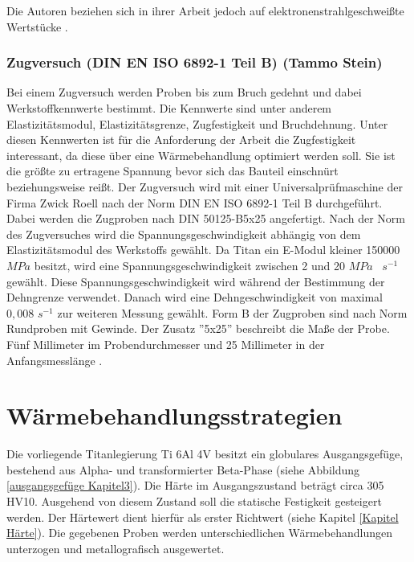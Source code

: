 \documentclass[a4paper, 11pt]{tubsreprt}
\begin{document}
Die Autoren beziehen sich in ihrer Arbeit jedoch auf elektronenstrahlgeschweißte Wertstücke \cite{Shi2013}.
\subsection{Zugversuch (DIN EN ISO 6892-1 Teil B) (Tammo Stein)}
\label{Kapitel Zugversuch}
Bei einem Zugversuch werden Proben bis zum Bruch gedehnt und dabei Werkstoffkennwerte bestimmt. Die Kennwerte sind unter anderem  Elastizitätsmodul, Elastizitätsgrenze, Zugfestigkeit und Bruchdehnung. Unter diesen Kennwerten ist für die Anforderung der Arbeit die Zugfestigkeit interessant, da diese über eine Wärmebehandlung optimiert werden soll. Sie ist die größte zu ertragene Spannung bevor sich das Bauteil einschnürt beziehungsweise reißt. Der Zugversuch wird mit einer Universalprüfmaschine der Firma Zwick Roell nach der Norm DIN EN ISO 6892-1 Teil B durchgeführt. Dabei werden die Zugproben nach DIN 50125-B5x25 angefertigt. Nach der Norm des Zugversuches wird die Spannungsgeschwindigkeit abhängig von dem Elastizitätsmodul des Werkstoffs gewählt. Da Titan ein E-Modul kleiner 150000 $MPa$ besitzt, wird eine Spannungsgeschwindigkeit zwischen 2 und 20 $MPa$~ $s^{-1}$ gewählt. Diese Spannungsgeschwindigkeit wird während der Bestimmung der Dehngrenze verwendet. Danach wird eine Dehngeschwindigkeit von maximal $0,008$ $s^{-1}$ zur weiteren Messung gewählt. Form B der Zugproben sind nach Norm Rundproben mit Gewinde. Der Zusatz ''5x25'' beschreibt die Maße der Probe. Fünf Millimeter im Probendurchmesser und 25 Millimeter in der Anfangsmesslänge \cite{DinZugproben2016} \cite{DinZugversuch2017}.



\chapter{Wärmebehandlungsstrategien}
Die vorliegende Titanlegierung Ti 6Al 4V besitzt ein globulares Ausgangsgefüge, bestehend aus Alpha- und transformierter Beta-Phase (siehe Abbildung \ref{ausgangsgefüge Kapitel3}). Die Härte im Ausgangszustand beträgt circa 305 HV10. Ausgehend von diesem Zustand soll die statische Festigkeit gesteigert werden. Der Härtewert dient hierfür als erster Richtwert (siehe Kapitel \ref{Kapitel Härte}). Die gegebenen Proben werden unterschiedlichen Wärmebehandlungen unterzogen und metallografisch ausgewertet. 
\end{document}
